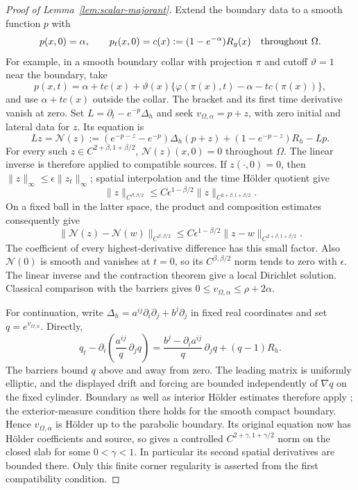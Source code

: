 \begin{proof}[Proof of Lemma~\ref{lem:scalar-majorant}]
Extend the boundary data to a smooth function $p$ with
\[
 p(x,0)=\alpha,\qquad
 p_t(x,0)=c(x):=(1-e^{-\alpha})R_g(x)
 \quad\hbox{throughout }\Omega.
\]
For example, in a smooth boundary collar with projection $\pi$
and cutoff $\vartheta=1$ near the boundary, take
\[
 p(x,t)=\alpha+t c(x)
   +\vartheta(x)\{\varphi(\pi(x),t)-\alpha-tc(\pi(x))\},
\]
and use $\alpha+tc(x)$ outside the collar.  The bracket and its
first time derivative vanish at zero.
Set $L=\partial_t-e^{-p}\Delta_h$ and seek
$v_{\Omega,\alpha}=p+z$, with zero
initial and lateral data for $z$.  Its equation is
\[
 Lz=\mathcal N(z):=
  (e^{-p-z}-e^{-p})\Delta_h(p+z)
  +(1-e^{-p-z})R_h-Lp.
\]
For every such $z\in C^{2+\beta,1+\beta/2}$,
$\mathcal N(z)(x,0)=0$ throughout $\Omega$.
The linear inverse is therefore applied to compatible sources.
If $z(\cdot,0)=0$, then
$\|z\|_\infty\le\epsilon\|z_t\|_\infty$; spatial interpolation
and the time H\"older quotient give
\[
 \|z\|_{C^{\beta,\beta/2}}
 \le C\epsilon^{1-\beta/2}
       \|z\|_{C^{2+\beta,1+\beta/2}}.
\]
On a fixed ball in the latter space, the product and composition
estimates consequently give
\[
 \|\mathcal N(z)-\mathcal N(w)\|_{C^{\beta,\beta/2}}
 \le C\epsilon^{1-\beta/2}
       \|z-w\|_{C^{2+\beta,1+\beta/2}}.
\]
The coefficient of every highest-derivative difference has this
small factor.  Also $\mathcal N(0)$ is smooth and vanishes at
$t=0$, so its $C^{\beta,\beta/2}$ norm tends to zero with $\epsilon$.
The linear inverse and the contraction theorem give a local
Dirichlet solution.  Classical comparison with the barriers gives
$0\le v_{\Omega,\alpha}\le\rho+2\alpha$.

For continuation, write
$\Delta_h=a^{ij}\partial_i\partial_j+b^j\partial_j$ in fixed
real coordinates and set $q=e^{v_{\Omega,\alpha}}$.  Directly,
\[
 q_t-\partial_i\left(\frac{a^{ij}}q\,\partial_jq\right)
  =\frac{b^j-\partial_i a^{ij}}q\,\partial_jq+(q-1)R_h.
\]
The barriers bound $q$ above and away from zero.  The leading
matrix is uniformly elliptic, and the displayed drift and forcing
are bounded independently of $\nabla q$ on the fixed cylinder.
Boundary as well as interior H\"older estimates therefore apply
\cite[Chapter~III, Theorem~10.1]{LSU}; the exterior-measure
condition there holds for the smooth compact boundary.
Hence $v_{\Omega,\alpha}$ is H\"older up to the parabolic boundary.
Its original equation now has H\"older coefficients and source,
so \cite[Chapter~IV, Theorem~5.2]{LSU} gives a controlled
$C^{2+\gamma,1+\gamma/2}$ norm on the closed slab for some
$0<\gamma<1$.  In particular its second spatial derivatives are
bounded there.  Only this finite corner regularity is asserted
from the first compatibility condition.


\end{proof}
